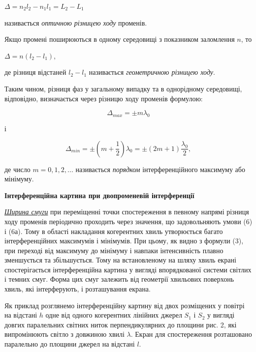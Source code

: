 \documentclass[12pt,a4paper]{article}
\begin{document}
    \begin{center}
        $\Delta = n_2 l_2 - n_1 l_1 = L_2 - L_1$
    \end{center}

    називається \textit{оптичною різницею ходу} променів.

    Якщо промені поширюються в одному середовищі з показником заломлення $n$, то

    \begin{center}
        $\Delta = n(l_2 - l_1)$,
    \end{center}

    де різниця відстаней $l_2 - l_1$ називається \textit{геометричною різницею ходу}.

    Таким чином, різниця фаз у загальному випадку та в однорідному середовищі,
    відповідно, визначається через різницю ходу променів формулою:

    \begin{equation}
        \Delta_{max} = \pm m \lambda_0
        \tag{6}
    \end{equation}

    і

    \begin{equation}
        \Delta_{min} = \pm \left( m + \frac{1}{2} \right) \lambda_0 = \pm \left( 2m + 1 \right) \frac{\lambda_0}{2},
        \tag{6а}
    \end{equation}

    де число $m = 0, 1, 2, ...$ називається \textit{порядком} інтерференційного максимуму або мінімуму.

    \begin{center} \textbf{Інтерференційна картина при двопроменевій інтерференції} \end{center}

    \textit{\underline{Ширина смуги}} при переміщенні точки спостереження в певному напрямі різниця ходу променів періодично проходить через значення,
    що задовольняють умови (6) і (6а). Тому в області накладання когерентних хвиль утворюється багато інтерференційних максимумів і мінімумів.
    При цьому, як видно з формули (3), при переході від максимуму до мінімуму і навпаки інтенсивність плавно зменшується та збільшується.
    Тому на встановленому на шляху хвиль екрані спостерігається інтерференційна картина у вигляді впорядкованої системи світлих і темних смуг.
    Форма цих смуг залежить від геометрії хвильових поверхонь хвиль, які інтерферують, і розташування екрана.

    Як приклад розглянемо інтерференційну картину від двох розміщених 
    у повітрі на відстані $h$ одне від одного когерентних лінійних джерел
    $S_1$ і $S_2$ у вигляді довгих паралельних світних ниток перпендикулярних
    до площини рис. 2, які випромінюють світло з довжиною хвилі $\lambda$.
    Екран для спостереження розташовано паралельно до площини джерел на відстані $l$.
\end{document}

